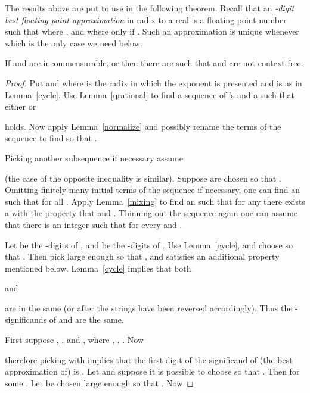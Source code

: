 \documentclass[12pt]{article}
\begin{document}
The results above are put to use in the following theorem. Recall that
an {\it -digit best floating point approximation\/} in radix  to a real  is a
floating point number  such that
 where ,  and where
 only if . Such an approximation
is unique whenever  which is the only case we need below.
\begin{theorem}\label{pdacs}
If  and  are incommensurable,  or  
then there are  such that  and
 are not context-free.
\end{theorem}
\begin{proof}
Put  and  where  is the radix in which the exponent is
presented and  is as in Lemma~\ref{cycle}. Use
Lemma~\ref{qrational} to find a sequence of 's and a  such
that either  or

holds. Now apply Lemma~\ref{normalize} and possibly rename the terms
of the sequence to find  so that 
.

Picking another subsequence if necessary assume
 
(the case of the opposite inequality is similar).
Suppose  are chosen so that . Omitting finitely many initial
terms of the sequence if necessary, one can find an  such
that  for all
. Apply Lemma~\ref{mixing} to find an
 such that for any  there exists a
 with the property that 
 and
. Thinning out the
sequence again one can assume that there is an integer  such
that for every   and
.
 
\iffalse Let  be the -digits of , and  be
the -digits of . Use Lemma~\ref{cycle} to find  and  then pick 
large enough so that , and  satisfies an additional
property mentioned below.
Lemma~\ref{cycle} implies that both 
 and 
 are in the same
 (or  after the strings
have been reversed accordingly and the remark after Lemma~\ref{cycle}
has been 
applied). Thus the -significands of 
and  are the same. 
\fi 

Let  be the -digits of , and  be the -digits
of .
Use Lemma~\ref{cycle}, and choose  so that
.
Then pick  large enough so that , and 
satisfies an additional property mentioned below.
Lemma~\ref{cycle} implies that both

and

are in the same 
(or  after the strings have been reversed accordingly).
Thus the -significands of 
and  are the same. 

First suppose ,
, and
, where
, , . Now

therefore picking  with  implies
that the first digit of the significand of (the best approximation of)
 is . Let 
and suppose it is possible to choose  so that
. Then for some 
. Let  be
chosen large enough so that 
. Now


\end{proof}
\end{document}
